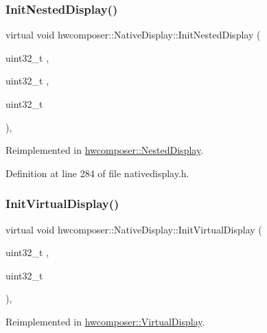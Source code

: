 \subsubsection{\texorpdfstring{Init\+Nested\+Display()}{InitNestedDisplay()}}
{\footnotesize\ttfamily virtual void hwcomposer\+::\+Native\+Display\+::\+Init\+Nested\+Display (\begin{DoxyParamCaption}\item[{uint32\+\_\+t}]{,  }\item[{uint32\+\_\+t}]{,  }\item[{uint32\+\_\+t}]{ }\end{DoxyParamCaption})\hspace{0.3cm}{\ttfamily [inline]}, {\ttfamily [virtual]}}



Reimplemented in \mbox{\hyperlink{classhwcomposer_1_1NestedDisplay_a39b326bbbe10454953815bb3e339c821}{hwcomposer\+::\+Nested\+Display}}.



Definition at line 284 of file nativedisplay.\+h.


\begin{DoxyCode}{0}
\end{DoxyCode}
\mbox{\label{classhwcomposer_1_1NativeDisplay_afea85ea07de4c4985b611873dac9af50}} 
\subsubsection{\texorpdfstring{Init\+Virtual\+Display()}{InitVirtualDisplay()}}
{\footnotesize\ttfamily virtual void hwcomposer\+::\+Native\+Display\+::\+Init\+Virtual\+Display (\begin{DoxyParamCaption}\item[{uint32\+\_\+t}]{,  }\item[{uint32\+\_\+t}]{ }\end{DoxyParamCaption})\hspace{0.3cm}{\ttfamily [inline]}, {\ttfamily [virtual]}}



Reimplemented in \mbox{\hyperlink{classhwcomposer_1_1VirtualDisplay_ad0bde041f8a66ab112818ded26e650ad}{hwcomposer\+::\+Virtual\+Display}}.




